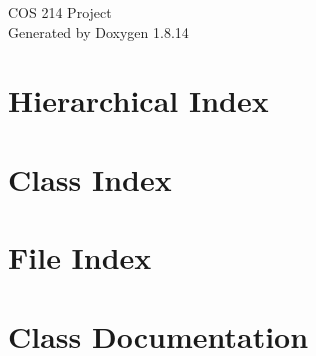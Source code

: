 \documentclass[twoside]{book}
\newcommand{\+}{\discretionary{\mbox{\scriptsize$\hookleftarrow$}}{}{}}
\newcommand{\clearemptydoublepage}{%
  \newpage{\pagestyle{empty}\cleardoublepage}%
}
\begin{document}
\hypersetup{pageanchor=false,
             bookmarksnumbered=true,
             pdfencoding=unicode
            }
\begin{titlepage}
\vspace*{7cm}
\begin{center}%
{\Large C\+OS 214 Project }\\
\vspace*{1cm}
{\large Generated by Doxygen 1.8.14}\\
\end{center}
\end{titlepage}
\clearemptydoublepage
{}
\tableofcontents
\clearemptydoublepage
{}
\hypersetup{pageanchor=true}

\chapter{Hierarchical Index}

\chapter{Class Index}

\chapter{File Index}

\chapter{Class Documentation}





























































\end{document}
